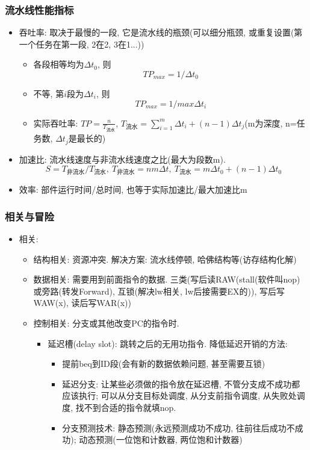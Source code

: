 \documentclass[UTF8]{article}
\begin{document}
\subsubsection{流水线性能指标}
\begin{itemize}
\item 吞吐率: 取决于最慢的一段, 它是流水线的瓶颈(可以细分瓶颈, 或重复设置(第一个任务在第一段, 2在2, 3在1...))
	\begin{itemize}
	\item 各段相等均为$\Delta t_0$, 则$$TP_{max}=1/\Delta t_0$$
	\item 不等, 第$i$段为$\Delta t_i$, 则$$TP_{max}=1/max{\Delta t_i}$$
	\item 实际吞吐率: $TP=\frac{n}{T_{\mbox{流水}}}$, $T_{\mbox{流水}}=\sum\limits_{i=1}^m\Delta t_i+(n-1)\Delta t_j$(m为深度, n=任务数, $\Delta t_j$是最长的)
	\end{itemize}
\item 加速比: 流水线速度与非流水线速度之比(最大为段数m).$$S=T_{\mbox{非流水}}/T_{\mbox{流水}},\ T_{\mbox{非流水}}=nm\Delta t,\ T_{\mbox{流水}}=m\Delta t_0+(n-1)\Delta t_0$$
\item 效率: 部件运行时间/总时间, 也等于实际加速比/最大加速比m
\end{itemize}
\subsubsection{相关与冒险}
\begin{itemize}
\item 相关:
	\begin{itemize}
	\item 结构相关: 资源冲突. 解决方案: 流水线停顿, 哈佛结构等(访存结构化解)
	\item 数据相关: 需要用到前面指令的数据. 三类(写后读RAW(stall(软件叫nop)或旁路(转发Forward), 互锁(解决lw相关, lw后接需要EX的)), 写后写WAW(x), 读后写WAR(x))
	\item 控制相关: 分支或其他改变PC的指令时. 
		\begin{itemize}
		\item 延迟槽(delay slot): 跳转之后的无用功指令. 降低延迟开销的方法: 
			\begin{itemize}
			\item 提前beq到ID段(会有新的数据依赖问题, 甚至需要互锁)
			\item 延迟分支: 让某些必须做的指令放在延迟槽, 不管分支成不成功都应该执行; 可以从分支目标处调度, 从分支前指令调度, 从失败处调度, 找不到合适的指令就填nop.
			\item 分支预测技术: 静态预测(永远预测成功不成功, 往前往后成功不成功); 动态预测(一位饱和计数器, 两位饱和计数器)
			\end{itemize}
		\end{itemize}
	\end{itemize}
\end{itemize}
\end{document}
